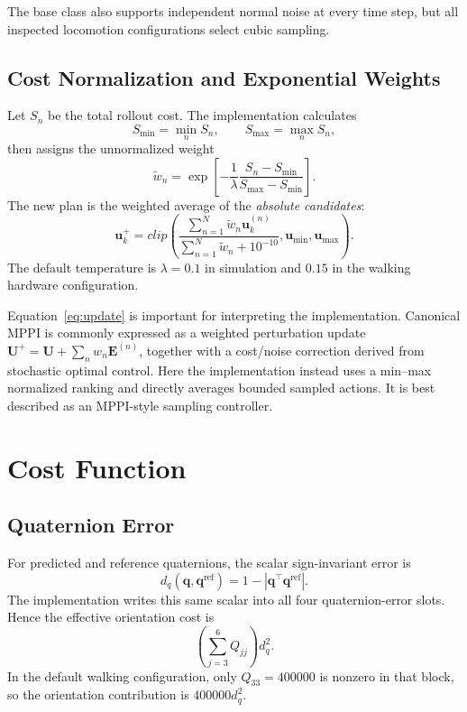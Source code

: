 \documentclass[11pt,a4paper]{article}
\begin{document}
The base class also supports independent normal noise at every time step, but
all inspected locomotion configurations select cubic sampling.

\subsection{Cost Normalization and Exponential Weights}

Let $S_n$ be the total rollout cost.  The implementation calculates
\begin{equation}
  S_{\min}=\min_n S_n,\qquad S_{\max}=\max_n S_n,
\end{equation}
then assigns the unnormalized weight
\begin{equation}
  \tilde w_n=\exp\left[
  -\frac{1}{\lambda}
  \frac{S_n-S_{\min}}{S_{\max}-S_{\min}}
  \right].
  \label{eq:weights}
\end{equation}
The new plan is the weighted average of the \emph{absolute candidates}:
\begin{equation}
  \boxed{
  \bm{u}^{+}_k=clip\left(
  \frac{\sum_{n=1}^{N}\tilde w_n\bm{u}^{(n)}_k}
       {\sum_{n=1}^{N}\tilde w_n+10^{-10}},
  \bm{u}_{\min},\bm{u}_{\max}\right).}
  \label{eq:update}
\end{equation}
The default temperature is $\lambda=0.1$ in simulation and $0.15$ in the
walking hardware configuration.

Equation~\eqref{eq:update} is important for interpreting the implementation.
Canonical MPPI is commonly expressed as a weighted perturbation update
$\bm{U}^{+}=\bm{U}+\sum_n w_n\bm{E}^{(n)}$, together with a cost/noise
correction derived from stochastic optimal control.  Here the implementation
instead uses a min--max normalized ranking and directly averages bounded
sampled actions.  It is best described as an MPPI-style sampling controller.

\section{Cost Function}

\subsection{Quaternion Error}

For predicted and reference quaternions, the scalar sign-invariant error is
\begin{equation}
  d_q(\bm{q},\bm{q}^{\mathrm{ref}})
  =1-\left|\bm{q}^\top\bm{q}^{\mathrm{ref}}\right|.
  \label{eq:quat_error}
\end{equation}
The implementation writes this same scalar into all four quaternion-error
slots.  Hence the effective orientation cost is
\begin{equation}
  \left(\sum_{j=3}^{6}Q_{jj}\right)d_q^2.
\end{equation}
In the default walking configuration, only $Q_{33}=400000$ is nonzero in
that block, so the orientation contribution is $400000d_q^2$.
\end{document}
